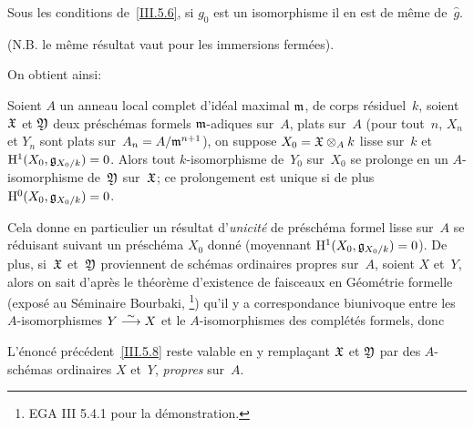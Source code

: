 \begin{corollaire}
\label{III.5.7} Sous les conditions de~\ref{III.5.6}, si $g_0$ est
un isomorphisme il en est de m\^eme de~$\widehat{g}$.
\end{corollaire}

\noindent
(N.B. le m\^eme r\'esultat vaut pour les immersions ferm\'ees).

On obtient ainsi:

\begin{proposition}
\label{III.5.8} Soient $A$ un anneau local complet d'id\'eal
maximal $\mathfrak{m}$,
de
corps r\'esiduel~$k$, soient $\mathfrak{X}$ et $\mathfrak{Y}$ deux
pr\'esch\'emas formels $\mathfrak{m}$-adiques sur~$A$, plats sur~$A$
(\ie pour tout~$n$, $X_n$ et $Y_n$ sont plats
sur~$A_n=A/\mathfrak{m}^{n+1}$), on suppose $X_0=\mathfrak{X}\otimes_Ak$ lisse
sur~$k$ et $\mathrm{H}^1(X_0,\mathfrak{g}_{X_0/k})=0$. Alors tout $k$-isomorphisme
de~$Y_0$ sur~$X_0$ se prolonge en un $A$-isomorphisme de~$\mathfrak{Y}$
sur~$\mathfrak{X}$; ce prolongement est unique si de plus
$\mathrm{H}^0(X_0,\mathfrak{g}_{X_0/k})=0$.
\end{proposition}

Cela donne en particulier un r\'esultat d'\emph{unicité} de
pr\'esch\'ema formel lisse sur~$A$ se r\'eduisant suivant un
pr\'esch\'ema $X_0$ donn\'e (moyennant
$\mathrm{H}^1(X_0,\mathfrak{g}_{X_0/k})=0$). De plus, si~$\mathfrak{X}$ et~$\mathfrak{Y}$
proviennent de sch\'emas ordinaires propres sur~$A$, soient $X$
et~$Y$, alors on sait d'apr\`es le th\'eor\`eme d'existence de
faisceaux en G\'eom\'etrie formelle (\cf expos\'e au
S\'eminaire Bourbaki, \footnote{\Cf EGA III 5.4.1 pour la
d\'emonstration.}) qu'il y a correspondance biunivoque entre les
$A$-isomorphismes $Y\overset{\sim}{\longrightarrow} X$ et le $A$-isomorphismes des
compl\'et\'es formels, donc

\begin{corollaire}
\label{III.5.9} L'\'enonc\'e pr\'ec\'edent~\ref{III.5.8} reste
valable en y rempla\c cant $\mathfrak{X}$ et $\mathfrak{Y}$ par des
$A$-sch\'emas ordinaires $X$ et~$Y$, \emph{propres} sur~$A$.
\end{corollaire}

